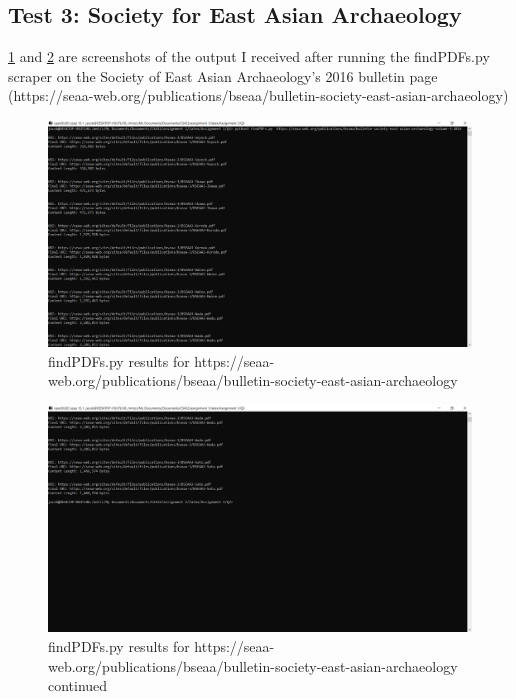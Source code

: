 \documentclass[12pt]{article}
\begin{document}
\subsection*{Test 3: Society for East Asian Archaeology} 
\ref{fig:q3ResponseSEAA_1} and \ref{fig:q3ResponseSEAA_2} are screenshots of the output I received after running the findPDFs.py scraper on the Society of East Asian Archaeology's 2016 bulletin page (https://seaa-web.org/publications/bseaa/bulletin-society-east-asian-archaeology)
\begin{figure}[H]
    \centering
    \includegraphics[trim=0 40 400 0, clip, width=\textwidth] {Q3/q3-seaaBulletin2016.png}
    \caption{findPDFs.py results for https://seaa-web.org/publications/bseaa/bulletin-society-east-asian-archaeology}
    \label{fig:q3ResponseSEAA_1}
\end{figure}

\begin{figure}[H]
    \centering
    \includegraphics[trim=0 300 400 70, clip, width=\textwidth] {Q3/q3-seaaBulletin2016_2.png}
    \caption{findPDFs.py results for https://seaa-web.org/publications/bseaa/bulletin-society-east-asian-archaeology continued}
    \label{fig:q3ResponseSEAA_2}
\end{figure}
\end{document}
